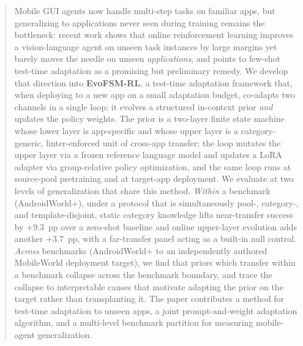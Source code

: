 \begin{abstract}
Mobile GUI agents now handle multi-step tasks on familiar apps, but generalizing
to applications never seen during training remains the bottleneck: recent work
shows that online reinforcement learning improves a vision-language agent on
unseen task instances by large margins yet barely moves the needle on unseen
\emph{applications}, and points to few-shot test-time adaptation as a promising
but preliminary remedy. We develop that direction into \textbf{EvoFSM-RL}, a
test-time adaptation framework that, when deploying to a new app on a small
adaptation budget, co-adapts two channels in a single loop: it evolves a
structured in-context prior \emph{and} updates the policy weights. The prior is a
two-layer finite state machine whose lower layer is app-specific and whose upper
layer is a category-generic, linter-enforced unit of cross-app transfer; the loop
mutates the upper layer via a frozen reference language model and updates a LoRA
adapter via group-relative policy optimization, and the same loop runs at
source-pool pretraining and at target-app deployment. We evaluate at two levels
of generalization that share this method. \emph{Within} a benchmark
(AndroidWorld+), under a protocol that is simultaneously pool-, category-, and
template-disjoint, static category knowledge lifts near-transfer success by
$+9.3$~pp over a zero-shot baseline and online upper-layer evolution adds another
$+3.7$~pp, with a far-transfer panel acting as a built-in null control.
\emph{Across} benchmarks (AndroidWorld+ to an independently authored MobileWorld
deployment target), we find that priors which transfer within a benchmark
collapse across the benchmark boundary, and trace the collapse to interpretable
causes that motivate adapting the prior on the target rather than transplanting
it. The paper contributes a method for test-time adaptation to unseen apps, a
joint prompt-and-weight adaptation algorithm, and a multi-level benchmark
partition for measuring mobile-agent generalization.
\end{abstract}
